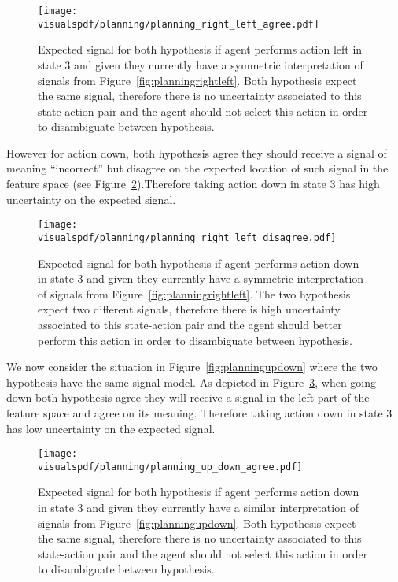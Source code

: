 \begin{figure}[!ht]
  \centering
  \texttt{[image: \\visualspdf/planning/planning\_right\_left\_agree.pdf]}
  \caption{Expected signal for both hypothesis if agent performs action left in state 3 and given they currently have a symmetric interpretation of signals from Figure~\ref{fig:planningrightleft}. Both hypothesis expect the same signal, therefore there is no uncertainty associated to this state-action pair and the agent should not select this action in order to disambiguate between hypothesis.}
  \label{fig:uncertaintysignalrightleftagree}
\end{figure}

However for action down, both hypothesis agree they should receive a signal of meaning ``incorrect'' but disagree on the expected location of such signal in the feature space (see Figure~\ref{fig:uncertaintysignalrightleftdisagree}).Therefore taking action down in state 3 has high uncertainty on the expected signal.

\begin{figure}[!ht]
  \centering
  \texttt{[image: \\visualspdf/planning/planning\_right\_left\_disagree.pdf]}
  \caption{Expected signal for both hypothesis if agent performs action down in state 3 and given they currently have a symmetric interpretation of signals from Figure~\ref{fig:planningrightleft}. The two hypothesis expect two different signals, therefore there is high uncertainty associated to this state-action pair and the agent should better perform this action in order to disambiguate between hypothesis.}
  \label{fig:uncertaintysignalrightleftdisagree}
\end{figure}


We now consider the situation in Figure~\ref{fig:planningupdown} where the two hypothesis have the same signal model. As depicted in Figure~\ref{fig:uncertaintysignalupdownagree}, when going down both hypothesis agree they will receive a signal in the left part of the feature space and agree on its meaning. Therefore taking action down in state 3 has low uncertainty on the expected signal.

\begin{figure}[!ht]
  \centering
  \texttt{[image: \\visualspdf/planning/planning\_up\_down\_agree.pdf]}
  \caption{Expected signal for both hypothesis if agent performs action down in state 3 and given they currently have a similar interpretation of signals from Figure~\ref{fig:planningupdown}. Both hypothesis expect the same signal, therefore there is no uncertainty associated to this state-action pair and the agent should not select this action in order to disambiguate between hypothesis.}
  \label{fig:uncertaintysignalupdownagree}
\end{figure}

